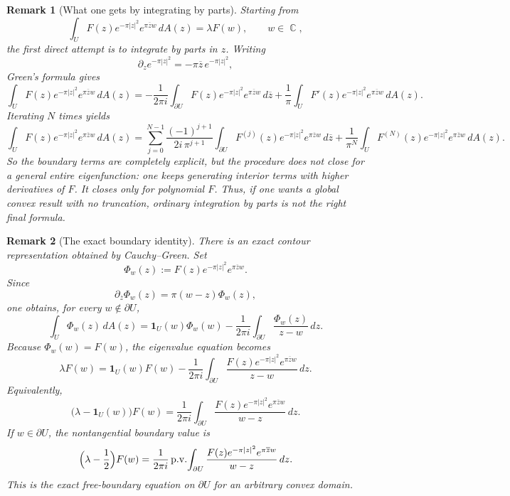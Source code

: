 \documentclass[a4paper,11pt,reqno]{amsart}
\newtheorem{remark}{Remark}[section]
\DeclareMathOperator{\C}{\mathbb{C}}
\begin{document}
\begin{remark}[What one gets by integrating by parts]
Starting from
\[
\int_U F(z)e^{-\pi|z|^2}e^{\pi\overline zw}\,dA(z)=\lambda F(w),
\qquad w\in\C,
\]
the first direct attempt is to integrate by parts in \(z\). Writing
\[
\partial_z e^{-\pi|z|^2}=-\pi \overline z\,e^{-\pi|z|^2},
\]
Green's formula gives
\[
\int_U F(z)e^{-\pi|z|^2}e^{\pi\overline zw}\,dA(z)
=
-\frac{1}{2\pi i}\int_{\partial U}
F(z)e^{-\pi|z|^2}e^{\pi\overline zw}\,d\overline z
+\frac{1}{\pi}\int_U F'(z)e^{-\pi|z|^2}e^{\pi\overline zw}\,dA(z).
\]
Iterating \(N\) times yields
\[
\int_U F(z)e^{-\pi|z|^2}e^{\pi\overline zw}\,dA(z)
=
\sum_{j=0}^{N-1}
\frac{(-1)^{j+1}}{2i\,\pi^{j+1}}
\int_{\partial U} F^{(j)}(z)e^{-\pi|z|^2}e^{\pi\overline zw}\,d\overline z
+\frac{1}{\pi^N}\int_U F^{(N)}(z)e^{-\pi|z|^2}e^{\pi\overline zw}\,dA(z).
\]
So the boundary terms are completely explicit, but the procedure does not close
for a general entire eigenfunction: one keeps generating interior terms with
higher derivatives of \(F\). It closes only for polynomial \(F\). Thus, if one
wants a global convex result with no truncation, ordinary integration by parts
is not the right final formula.
\end{remark}

\begin{remark}[The exact boundary identity]
There is an exact contour representation obtained by Cauchy--Green. Set
\[
\Phi_w(z):=F(z)e^{-\pi|z|^2}e^{\pi\overline zw}.
\]
Since
\[
\partial_{\overline z}\Phi_w(z)=\pi(w-z)\Phi_w(z),
\]
one obtains, for every \(w\notin\partial U\),
\[
\int_U \Phi_w(z)\,dA(z)
=
\mathbf 1_U(w)\Phi_w(w)
-\frac{1}{2\pi i}\int_{\partial U}\frac{\Phi_w(z)}{z-w}\,dz.
\]
Because \(\Phi_w(w)=F(w)\), the eigenvalue equation becomes
\begin{equation}\label{eq:global-boundary-identity}
\lambda F(w)
=
\mathbf 1_U(w)F(w)
-\frac{1}{2\pi i}\int_{\partial U}
\frac{F(z)e^{-\pi|z|^2}e^{\pi\overline zw}}{z-w}\,dz.
\end{equation}
Equivalently,
\[
\bigl(\lambda-\mathbf 1_U(w)\bigr)F(w)
=
\frac{1}{2\pi i}\int_{\partial U}
\frac{F(z)e^{-\pi|z|^2}e^{\pi\overline zw}}{w-z}\,dz.
\]
If \(w\in\partial U\), the nontangential boundary value is
\[
\Bigl(\lambda-\frac12\Bigr)F(w)
=
\frac{1}{2\pi i}\,\mathrm{p.v.}\!\int_{\partial U}
\frac{F(z)e^{-\pi|z|^2}e^{\pi\overline zw}}{w-z}\,dz.
\]
This is the exact free-boundary equation on \(\partial U\) for an arbitrary
convex domain.
\end{remark}
\end{document}
